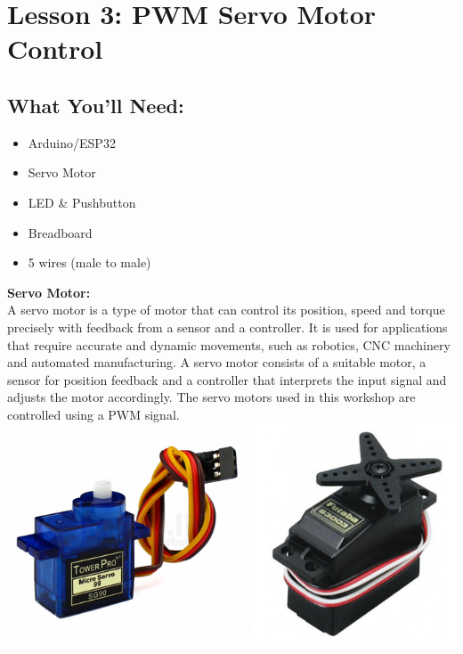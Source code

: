 \documentclass[a4paper,12pt]{report}
\begin{document}
\newpage

\section*{Lesson 3: PWM Servo Motor Control}
    \subsection*{What You'll Need:}
            \begin{itemize}
                \item Arduino/ESP32
                \item Servo Motor
                \item LED \& Pushbutton
                \item Breadboard
                \item 5 wires (male to male)
            \end{itemize}
        \begin{mdframed}[linewidth = 3, linecolor = turbo_purple]
            \textbf{Servo Motor:}
            \\
            A servo motor is a type of motor that can control its position, speed and torque precisely 
            with feedback from a sensor and a controller. It is used for applications that require accurate 
            and dynamic movements, such as robotics, CNC machinery and automated manufacturing. A servo motor 
            consists of a suitable motor, a sensor for position feedback and a controller that interprets the 
            input signal and adjusts the motor accordingly.            
            The servo motors used in this workshop are controlled using a PWM signal.
            \\
            \includegraphics[scale = 1]{Assets/servos.png}
        \end{mdframed}
        \newpage
\end{document}

